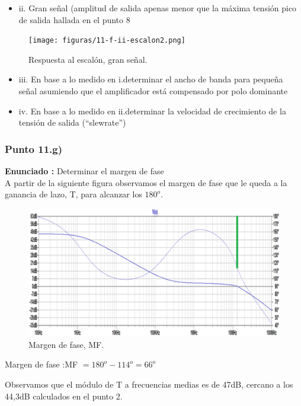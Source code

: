 \documentclass[12pt]{book}
\begin{document}
\begin{itemize}
\item ii. Gran señal (amplitud de salida apenas menor que la máxima tensión pico de salida hallada en el punto 8
\end{itemize}
\begin{figure}[H]
\centering
\texttt{[image: figuras/11-f-ii-escalon2.png]}
\caption{Respuesta al escalón, gran señal.}
\label{figura11fii}
\end{figure}

\begin{itemize}
\item iii. En base a lo medido en i.determinar el ancho de banda para pequeña señal asumiendo que el amplificador está compensado por polo dominante
\end{itemize}

\begin{itemize}
\item iv. En base a lo medido en ii.determinar la velocidad de crecimiento de la tensión de salida (“slewrate”)
\end{itemize}

\subsubsection{Punto 11.g)}
\textbf{Enunciado : } Determinar el margen de fase\\[1cm]
A partir de la siguiente figura observamos el margen de fase que le queda a la ganancia de lazo, T, para alcanzar los $180^o$.
\begin{figure}[H]
\centering
\includegraphics[scale=0.4]{figuras/11-g-margenFase.png}
\caption{Margen de fase, MF.}
\label{figura11g}
\end{figure}
\begin{center}
Margen de fase :\quad MF $=180^{o}-114^{o}=66^{o}$
\end{center}
Observamos que el módulo de T a frecuencias medias es de 47dB, cercano a los 44,3dB calculados en el punto 2.
\end{document}
